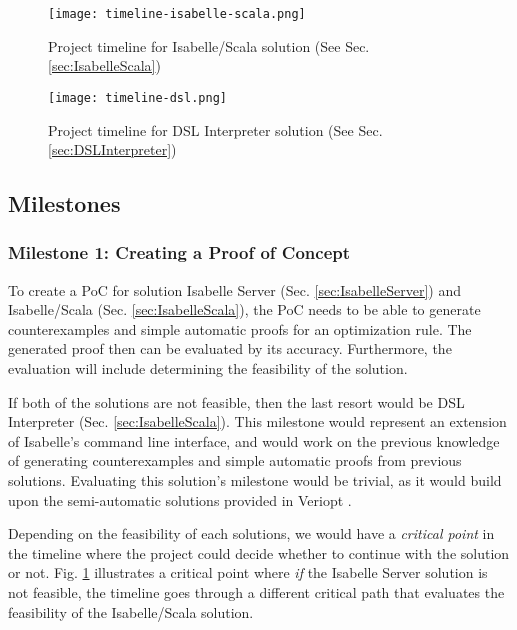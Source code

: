 \begin{figure}
    \label{fig:TimelineIsabelleScala}
    \centering
    \texttt{[image: timeline-isabelle-scala.png]}
    \caption{Project timeline for Isabelle/Scala solution (See Sec. \ref{sec:IsabelleScala})}
\end{figure}

\begin{figure}
    \label{fig:TimelineDSLInterpreter}
    \centering
    \texttt{[image: timeline-dsl.png]}
    \caption{Project timeline for DSL Interpreter solution (See Sec. \ref{sec:DSLInterpreter})}
\end{figure}

\pagebreak

\subsection{Milestones}
\label{sec:Milestones}

\subsubsection{Milestone 1: Creating a Proof of Concept}

To create a PoC for solution Isabelle Server (Sec. \ref{sec:IsabelleServer}) and Isabelle/Scala (Sec. \ref{sec:IsabelleScala}), 
the PoC needs to be able to generate counterexamples and simple automatic proofs for an optimization rule. 
The generated proof then can be evaluated by its accuracy. Furthermore, the evaluation will include determining the 
feasibility of the solution.

If both of the solutions are not feasible, then the last resort would be DSL Interpreter (Sec. \ref{sec:IsabelleScala}).
This milestone would represent an extension of Isabelle's \cite{IsabelleHOL} command line interface, and would work on 
the previous knowledge of generating counterexamples and simple automatic proofs from previous solutions. Evaluating this 
solution's milestone would be trivial, as it would build upon the semi-automatic solutions provided in Veriopt 
\cite[Sec. 5.1]{Term_Graph_Optimizations}.

Depending on the feasibility of each solutions, we would have a \emph{critical point} in the timeline where the project 
could decide whether to continue with the solution or not. Fig. \ref{fig:TimelineIsabelleScala} illustrates a critical point 
where \emph{if} the Isabelle Server solution is not feasible, the timeline goes through a different critical path that 
evaluates the feasibility of the Isabelle/Scala solution.

